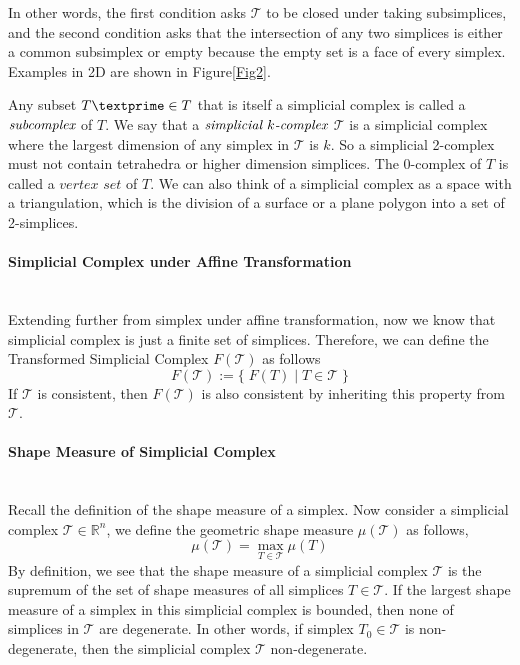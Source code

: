     In other words, the first condition asks $\mathcal{T}$ to be closed under taking subsimplices, and the second condition asks that the intersection of any two simplices is either a common subsimplex or empty because the empty set is a face of every simplex. Examples in 2D are shown in Figure\ref{Fig2}. 

    Any subset ${T\textprime}\in{T}$ that is itself a simplicial complex is called a $\emph{subcomplex}$ of ${T}$. We say that a $\emph{simplicial $k$-complex}$ $\mathcal T$ is a simplicial complex where the largest dimension of any simplex in $\mathcal T$ is ${k}$. So a simplicial 2-complex must not contain tetrahedra or higher dimension simplices. The 0-complex of ${T}$ is called a $\textit{vertex set}$ of ${T}$. We can also think of a simplicial complex as a space with a triangulation, which is the division of a surface or a plane polygon into a set of 2-simplices. 

    \paragraph{Simplicial Complex under Affine Transformation}\mbox{}\\
    Extending further from simplex under affine transformation, now we know that simplicial complex is just a finite set of simplices. Therefore, we can define the Transformed Simplicial Complex $F(\mathcal{T})$ as follows
    \begin{equation*}
    F(\mathcal{T}) := \{ \; F(T) \;\vert\; T \in \mathcal{T} \; \}
    \end{equation*}
    If $\mathcal{T}$ is consistent, then $F(\mathcal{T})$ is also consistent by inheriting this property from $\mathcal{T}$.

    \paragraph{Shape Measure of Simplicial Complex}\mbox{}\\
    Recall the definition of the shape measure of a simplex.
    Now consider a simplicial complex $\mathcal{T}\in\mathbb{R}^n$, we define the geometric shape measure $\mu(\mathcal{T})$ as follows,
    \begin{equation*}
    \mu(\mathcal{T}) = \max_{T \in \mathcal{T}} \mu(T)
    \end{equation*}
    By definition, we see that the shape measure of a simplicial complex $\mathcal{T}$ is the supremum of the set of shape measures of all simplices $T\in\mathcal{T}$. If the largest shape measure of a simplex in this simplicial complex is bounded, then none of simplices in $\mathcal{T}$ are degenerate. In other words, if simplex $T_0 \in\mathcal{T}$ is non-degenerate, then the simplicial complex $\mathcal{T}$ non-degenerate.
